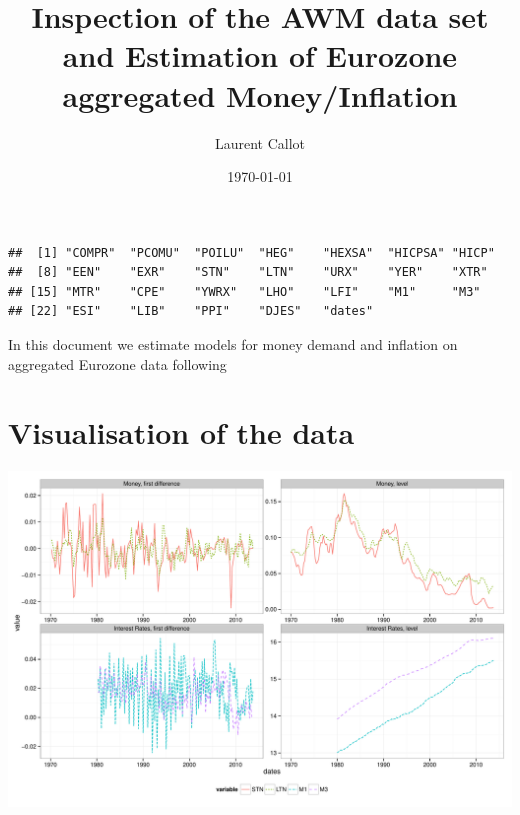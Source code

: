 \documentclass[11pt,oneside, a4paper]{amsart}\usepackage[]{graphicx}\usepackage[]{color}
\makeatletter
\newenvironment{kframe}{%
 \def\at@end@of@kframe{}%
 \ifinner\ifhmode%
  \def\at@end@of@kframe{\end{minipage}}%
  \begin{minipage}{\columnwidth}%
 \fi\fi%
 \def\FrameCommand##1{\hskip\@totalleftmargin \hskip-\fboxsep
 \colorbox{shadecolor}{##1}\hskip-\fboxsep
     \hskip-\linewidth \hskip-\@totalleftmargin \hskip\columnwidth}%
 \MakeFramed {\advance\hsize-\width
   \@totalleftmargin\z@ \linewidth\hsize
   \@setminipage}}%
 {\par\unskip\endMakeFramed%
 \at@end@of@kframe}
\newenvironment{knitrout}{}{} %
\makeatother
\begin{document}
	
\title{Inspection of the AWM data set and Estimation of Eurozone aggregated Money/Inflation }   
\author{Laurent Callot}
\date{\today}
\maketitle



\begin{knitrout}
\color{fgcolor}\begin{kframe}
\begin{verbatim}
##  [1] "COMPR"  "PCOMU"  "POILU"  "HEG"    "HEXSA"  "HICPSA" "HICP"  
##  [8] "EEN"    "EXR"    "STN"    "LTN"    "URX"    "YER"    "XTR"   
## [15] "MTR"    "CPE"    "YWRX"   "LHO"    "LFI"    "M1"     "M3"    
## [22] "ESI"    "LIB"    "PPI"    "DJES"   "dates"
\end{verbatim}
\end{kframe}
\end{knitrout}


In this document we estimate models for money demand and inflation on aggregated Eurozone data following \cite{baardsen2005econometrics}


\section{Visualisation of the data}


\begin{knitrout}
\color{fgcolor}

{\centering \includegraphics[width=\textwidth]{figure/plot_moneyir-1} 

}



\end{knitrout}
\end{document}
